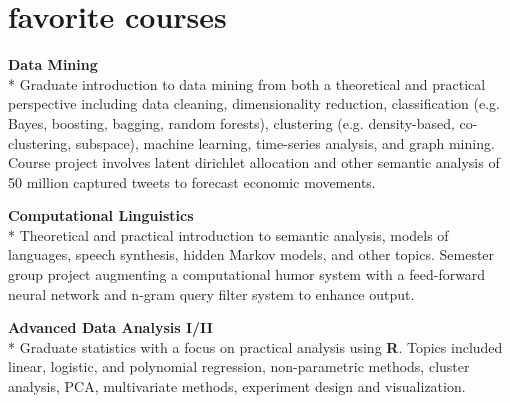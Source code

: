 \documentclass[]{friggeri-cv} %
\begin{document}



\section{favorite courses}
\begin{description}
  \item \textbf{Data Mining } \\*
    Graduate introduction to data mining from both a theoretical and practical
    perspective including data cleaning, dimensionality reduction,
    classification (e.g. Bayes, boosting, bagging, random forests), clustering
    (e.g. density-based, co-clustering, subspace), machine learning,
    time-series analysis, and graph mining.  Course project involves latent
    dirichlet allocation and other semantic analysis of 50 million captured
    tweets to forecast economic movements. \hfill
   \item \textbf{Computational Linguistics} \\*
     Theoretical and practical introduction to semantic analysis, models of
     languages, speech synthesis, hidden Markov models, and other topics.
     Semester group project augmenting a computational humor system with a
     feed-forward neural network and n-gram query filter system to enhance
     output.
 \item \textbf{Advanced Data Analysis I/II} \\*
     Graduate statistics with a focus on practical analysis using \textbf{R}.
     Topics included linear, logistic, and polynomial regression,
     non-parametric methods, cluster analysis, PCA, multivariate methods,
     experiment design and visualization.
\end{description}
\end{document}
